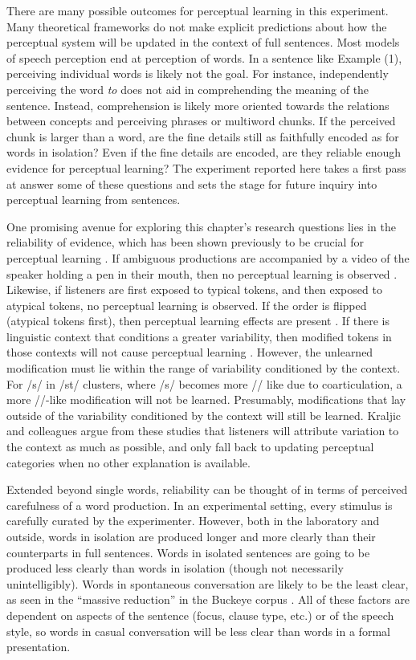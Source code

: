 There are many possible outcomes for perceptual learning in this experiment.
Many theoretical frameworks do not make explicit predictions about how the perceptual system will be updated in the context of full sentences.
Most models of speech perception end at perception of words.
In a sentence like Example (1), perceiving individual words is likely not the goal.
For instance, independently perceiving the word \emph{to} does not aid in comprehending the meaning of the sentence.
Instead, comprehension is likely more oriented towards the relations between concepts and perceiving phrases or multiword chunks.
If the perceived chunk is larger than a word, are the fine details still as faithfully encoded as for words in isolation?
Even if the fine details are encoded, are they reliable enough evidence for perceptual learning?
The experiment reported here takes a first pass at answer some of these questions and sets the stage for future inquiry into perceptual learning from sentences. 

One promising avenue for exploring this chapter's research questions lies in the reliability of evidence, which has been shown previously to be crucial for perceptual learning \citep{Kraljic2008, Kraljic2008a}.
If ambiguous productions are accompanied by a video of the speaker holding a pen in their mouth, then no perceptual learning is observed \citep{Kraljic2008}.
Likewise, if listeners are first exposed to typical tokens, and then exposed to atypical tokens, no perceptual learning is observed.
If the order is flipped (atypical tokens first), then perceptual learning effects are present \citep{Kraljic2008}.
If there is linguistic context that conditions a greater variability, then modified tokens in those contexts will not cause perceptual learning \citep{Kraljic2008a}.
However, the unlearned modification must lie within the range of variability conditioned by the context.
For /s/ in /st\textturnr/ clusters, where /s/ becomes more /\textesh/ like due to coarticulation, a more /\textesh/-like modification will not be learned.
Presumably, modifications that lay outside of the variability conditioned by the context will still be learned.
Kraljic and colleagues argue from these studies that listeners will attribute variation to the context as much as possible, and only fall back to updating perceptual categories when no other explanation is available.

Extended beyond single words, reliability can be thought of in terms of perceived carefulness of a word production.
In an experimental setting, every stimulus is carefully curated by the experimenter.
However, both in the laboratory and outside, words in isolation are produced longer and more clearly than their counterparts in full sentences.
Words in isolated sentences are going to be produced less clearly than words in isolation (though not necessarily unintelligibly).
Words in spontaneous conversation are likely to be the least clear, as seen in the ``massive reduction'' in the Buckeye corpus \citep{Johnson2004, Dilts2013}.
All of these factors are dependent on aspects of the sentence (focus, clause type, etc.) or of the speech style, so words in casual conversation will be less clear than words in a formal presentation.


